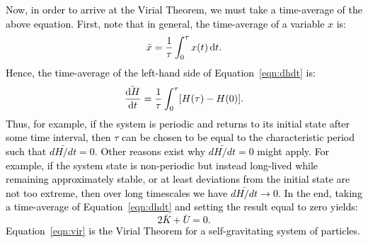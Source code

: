 \documentclass[main.tex]{subfiles}
\begin{document}
\begin{tcolorbox}[sharp corners, colback=green!30, colframe=green!80!blue, title=Box \ref{boxchap2:vt} -- Virial Theorem (continued)]
\par \textcolor{black} {
Now, in order to arrive at the Virial Theorem, we must take a time-average of the above equation.  First, note that in general, the time-average of a variable $x$ is:
\begin{equation}
\bar{x} = \frac{1}{\tau}\int_{0}^{\rm \tau} x(t) \,\mathrm{d}t.
\end{equation}
Hence, the time-average of the left-hand side of Equation~\ref{eqn:dhdt} is:
\begin{equation}
\bar{\frac{\mathrm{d}H}{\mathrm{d}t}} = \frac{1}{\tau}\int_{0}^{\rm \tau} [H(\tau) - H(0)].
\end{equation}
Thus, for example, if the system is periodic and returns to its initial state after some time interval, then $\tau$ can be chosen to be equal to the characteristic period such that $\bar{dH/dt} = 0$.  Other reasons exist why $\bar{dH/dt} = 0$ might apply.  For example, if the system state is non-periodic but instead long-lived while remaining approximately stable, or at least deviations from the initial state are not too extreme, then over long timescales we have $\bar{dH/dt} \rightarrow 0$.  In the end, taking a time-average of Equation~\ref{eqn:dhdt} and setting the result equal to zero yields:
\begin{equation}
2\bar{K} + \bar{U} = 0.
\label{eqn:vir}
\end{equation}
Equation~\ref{eqn:vir} is the Virial Theorem for a self-gravitating system of particles.}
\end{tcolorbox}
\end{document}
